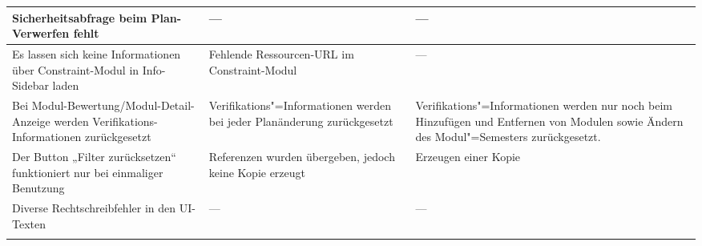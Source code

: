 \begin{longtable}{| >{\hspace{0pt}} p{} | >{\hspace{0pt}} p{} | >{\hspace{0pt}} p{} | }
	\hline
	Sicherheitsabfrage beim Plan-Verwerfen fehlt & --- & --- \\
	\hline
	Es lassen sich keine Informationen über Constraint-Modul in Info-Sidebar laden & Fehlende Ressourcen-URL im Constraint-Modul & --- \\
	\hline
	Bei Modul-Bewertung/Modul-Detail-Anzeige werden Verifikations-Informationen zurückgesetzt & Verifikations"=Informationen werden bei jeder Planänderung zurückgesetzt & Verifikations"=Informationen werden nur noch beim Hinzufügen und Entfernen von Modulen sowie Ändern des Modul"=Semesters zurückgesetzt. \\
	\hline
	Der Button „Filter zurücksetzen“ funktioniert nur bei einmaliger Benutzung & Referenzen wurden übergeben, jedoch keine Kopie erzeugt & Erzeugen einer Kopie \\
	\hline
	Diverse Rechtschreibfehler in den UI-Texten & --- & --- \\
	\hhline{|=|=|=|}
\end{longtable}
